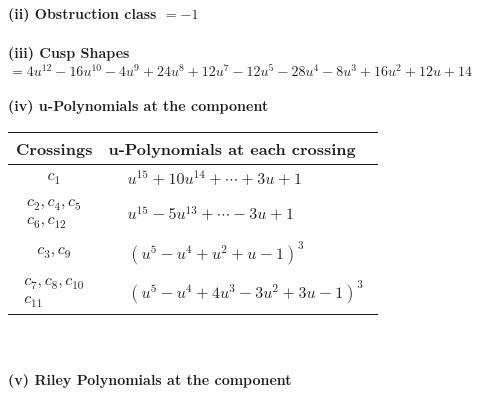 \documentclass[1p]{elsarticle_modified}
\theoremstyle{definition}
\begin{document}
\flushleft \textbf{(ii) Obstruction class $= -1$}\\~\\
\flushleft \textbf{(iii) Cusp Shapes $= 4 u^{12}-16 u^{10}-4 u^9+24 u^8+12 u^7-12 u^5-28 u^4-8 u^3+16 u^2+12 u+14$}\\~\\
\newpage\renewcommand{\arraystretch}{1}
\flushleft \textbf{(iv) u-Polynomials at the component}\newline \\
\begin{tabular}{m{50pt}|m{274pt}}
Crossings & \hspace{64pt}u-Polynomials at each crossing \\
\hline $$\begin{aligned}c_{1}\end{aligned}$$&$\begin{aligned}
&u^{15}+10 u^{14}+\cdots+3 u+1
\end{aligned}$\\
\hline $$\begin{aligned}c_{2},c_{4},c_{5}\\c_{6},c_{12}\end{aligned}$$&$\begin{aligned}
&u^{15}-5 u^{13}+\cdots-3 u+1
\end{aligned}$\\
\hline $$\begin{aligned}c_{3},c_{9}\end{aligned}$$&$\begin{aligned}
&(u^5- u^4+u^2+u-1)^3
\end{aligned}$\\
\hline $$\begin{aligned}c_{7},c_{8},c_{10}\\c_{11}\end{aligned}$$&$\begin{aligned}
&(u^5- u^4+4 u^3-3 u^2+3 u-1)^3
\end{aligned}$\\
\hline
\end{tabular}\\~\\
\newpage\renewcommand{\arraystretch}{1}
\flushleft \textbf{(v) Riley Polynomials at the component}\newline \\
\end{document}
